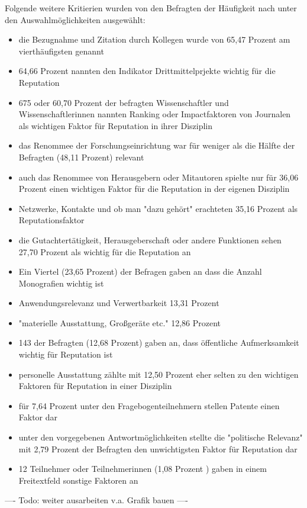 Folgende weitere Kritierien wurden von den Befragten der Häufigkeit nach unter den Auswahlmöglichkeiten ausgewählt:
\begin{itemize}
\item die Bezugnahme und Zitation durch Kollegen wurde von 65,47 Prozent am vierthäufigsten genannt
\item 64,66 Prozent nannten den Indikator Drittmittelprjekte wichtig für die Reputation
\item 675 oder 60,70 Prozent der befragten Wissenschaftler und Wissenschaftlerinnen nannten Ranking oder Impactfaktoren von Journalen als wichtigen Faktor für Reputation in ihrer Disziplin
\item das Renommee der Forschungseinrichtung war für weniger als die Hälfte der Befragten (48,11 Prozent) relevant
\item auch das Renommee von Herausgebern oder Mitautoren spielte nur für 36,06 Prozent einen wichtigen Faktor für die Reputation in der eigenen Disziplin
\item Netzwerke, Kontakte und ob man "dazu gehört" erachteten 35,16 Prozent als Reputationsfaktor
\item die Gutachtertätigkeit, Herausgeberschaft oder andere Funktionen sehen 27,70 Prozent als wichtig für die Reputation an
\item Ein Viertel (23,65 Prozent) der Befragen gaben an dass die Anzahl Monografien wichtig ist
\item Anwendungsrelevanz und Verwertbarkeit 13,31 Prozent
\item "materielle Ausstattung, Großgeräte etc." 12,86 Prozent
\item 143 der Befragten (12,68 Prozent) gaben an, dass öffentliche Aufmerksamkeit wichtig für Reputation ist
\item personelle Ausstattung zählte mit 12,50 Prozent eher selten zu den wichtigen Faktoren für Reputation in einer Disziplin
\item für 7,64 Prozent unter den Fragebogenteilnehmern stellen Patente einen Faktor dar
\item unter den vorgegebenen Antwortmöglichkeiten stellte die "politische Relevanz" mit 2,79 Prozent der Befragten den unwichtigsten Faktor für Reputation dar
\item 12 Teilnehmer oder Teilnehmerinnen (1,08 Prozent ) gaben in einem Freitextfeld sonstige Faktoren an
\end{itemize}

---- Todo: weiter ausarbeiten v.a. Grafik bauen ----

